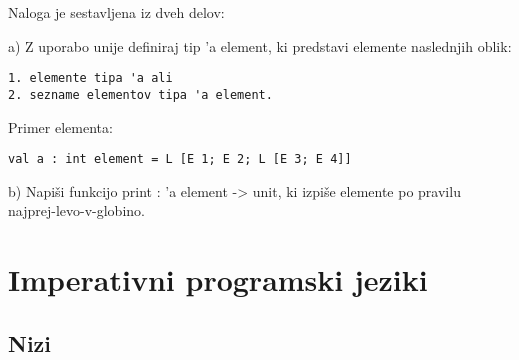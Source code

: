 \begin{ex}Naloga je sestavljena iz dveh delov:

a) Z uporabo unije definiraj tip 'a element, ki predstavi elemente naslednjih oblik:
\begin{lstlisting}
1. elemente tipa 'a ali
2. sezname elementov tipa 'a element.
\end{lstlisting}
    Primer elementa: 
\begin{lstlisting}
val a : int element = L [E 1; E 2; L [E 3; E 4]]
\end{lstlisting}

b) Napi\v si funkcijo print : 'a element -> unit, ki izpi\v se elemente po pravilu                          
    najprej-levo-v-globino.



\end{ex} 

\chapter{Imperativni programski jeziki}

\section{Nizi}

